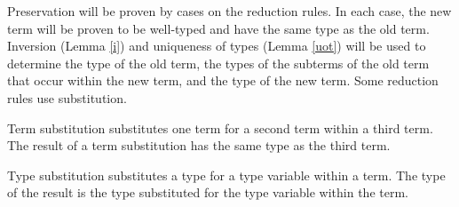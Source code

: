 Preservation will be proven by cases on the reduction rules.  In each case, the new term will be proven to be well-typed and have the same type as the old term.  Inversion (Lemma \ref{i}) and uniqueness of types (Lemma \ref{uot}) will be used to determine the type of the old term, the types of the subterms of the old term that occur within the new term, and the type of the new term.  Some reduction rules use substitution.

Term substitution substitutes one term for a second term within a third term.  The result of a term substitution has the same type as the third term.



Type substitution substitutes a type for a type variable within a term.  The type of the result is the type substituted for the type variable within the term.



